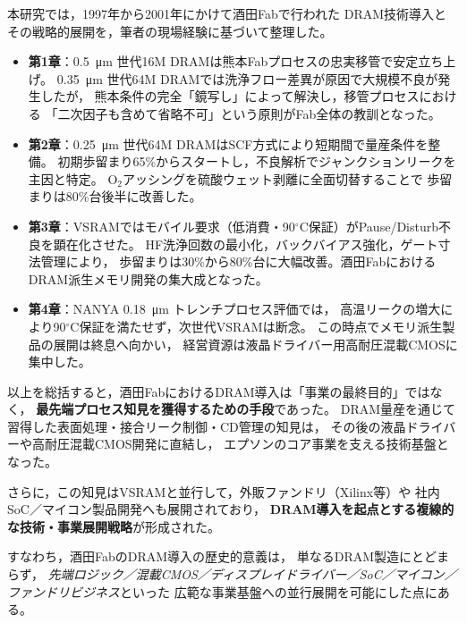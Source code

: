 \documentclass[conference]{IEEEtran}
\begin{document}
本研究では，1997年から2001年にかけて酒田Fabで行われた
DRAM技術導入とその戦略的展開を，筆者の現場経験に基づいて整理した。

\begin{itemize}
  \item \textbf{第1章}：\SI{0.5}{\micro\meter} 世代16M DRAMは熊本Fabプロセスの忠実移管で安定立ち上げ。
        \SI{0.35}{\micro\meter} 世代64M DRAMでは洗浄フロー差異が原因で大規模不良が発生したが，
        熊本条件の完全「鏡写し」によって解決し，移管プロセスにおける
        「二次因子も含めて省略不可」という原則がFab全体の教訓となった。
  \item \textbf{第2章}：\SI{0.25}{\micro\meter} 世代64M DRAMはSCF方式により短期間で量産条件を整備。
        初期歩留まり65\%からスタートし，不良解析でジャンクションリークを主因と特定。
        O$_2$アッシングを硫酸ウェット剥離に全面切替することで
        歩留まりは80\%台後半に改善した。
  \item \textbf{第3章}：VSRAMではモバイル要求（低消費・90$^\circ$C保証）がPause/Disturb不良を顕在化させた。
        HF洗浄回数の最小化，バックバイアス強化，ゲート寸法管理により，
        歩留まりは30\%から80\%台に大幅改善。酒田FabにおけるDRAM派生メモリ開発の集大成となった。
  \item \textbf{第4章}：NANYA \SI{0.18}{\micro\meter} トレンチプロセス評価では，
        高温リークの増大により90$^\circ$C保証を満たせず，次世代VSRAMは断念。
        この時点でメモリ派生製品の展開は終息へ向かい，
        経営資源は液晶ドライバー用高耐圧混載CMOSに集中した。
\end{itemize}

\noindent
以上を総括すると，酒田FabにおけるDRAM導入は「事業の最終目的」ではなく，
\textbf{最先端プロセス知見を獲得するための手段}であった。  
DRAM量産を通じて習得した表面処理・接合リーク制御・CD管理の知見は，
その後の液晶ドライバーや高耐圧混載CMOS開発に直結し，
エプソンのコア事業を支える技術基盤となった。

さらに，この知見はVSRAMと並行して，外販ファンドリ（Xilinx等）や
社内SoC／マイコン製品開発へも展開されており，
\textbf{DRAM導入を起点とする複線的な技術・事業展開戦略}が形成された。  

すなわち，酒田FabのDRAM導入の歴史的意義は，
単なるDRAM製造にとどまらず，
\emph{先端ロジック／混載CMOS／ディスプレイドライバー／SoC／マイコン／ファンドリビジネス}といった
広範な事業基盤への並行展開を可能にした点にある。
\end{document}
